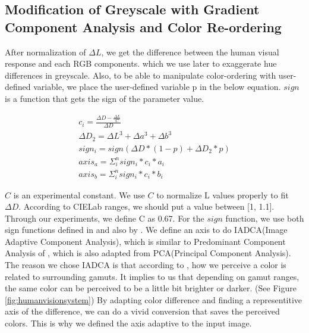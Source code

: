 \documentclass{article}
\begin{document}
\subsection{Modification of Greyscale with Gradient Component Analysis and Color Re-ordering}
After normalization of $\Delta L$, we get the difference between the human visual response and each RGB components. which we use later to exaggerate hue differences in greyscale. Also, to be able to manipulate color-ordering with user-defined variable, we place the user-defined variable p in the below equation. $sign$ is a function that gets the sign of the parameter value.

\begin{eqnarray}
c_i = \frac { \Delta D - \frac{\Delta L}{ C }  } {\Delta D } \\
\Delta D_2 = \Delta L^3 + \Delta a^3 + \Delta b^3 \\
sign_i = sign(  \Delta D * (1-p) + \Delta D_2 * p ) \\
axis_a = \Sigma_i^n sign_i * c_i * a_i  \\
axis_b = \Sigma_i^n sign_i * c_i * b_i 
\end{eqnarray}




$C$ is an experimental constant. We use $C$ to normalize L values properly to fit $\Delta D$. According to CIELab ranges, we should put a value between [1, 1.1]. Through our experiments, we define C as 0.67. For the $sign$ function, we use both sign functions defined in \cite {cadik07color_to_gray} and also by \cite{journals/pr/GrundlandD07}. We define an axis to do IADCA(Image Adaptive Component Analysis), which is similar to Predominant Component Analysis of \cite{journals/pr/GrundlandD07}, which is also adapted from PCA(Principal Component Analysis). The reason we chose IADCA is that according to \cite{Hunt}, how we perceive a color is related to surrounding gamuts. It implies to us that depending on gamut ranges, the same color can be perceived to be a little bit brighter or darker. (See Figure \ref{fig:humanvisionsystem}) By adapting color difference and finding a representitive axis of the difference, we can do a vivid conversion that saves the perceived colors. This is why we defined the axis adaptive to the input image.
\end{document}
